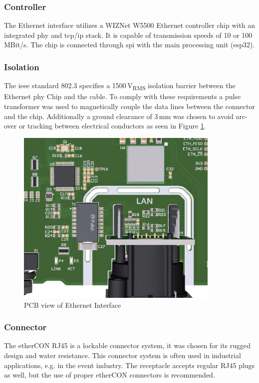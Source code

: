\subsubsection{Controller}
The Ethernet interface utilizes a WIZNet W5500 Ethernet controller chip with an integrated \acrshort{phy} and \acrshort{tcp}/\acrshort{ip} stack. It is capable of transmission speeds of 10 or 100\,MBit/s. The chip is connected through \acrshort{spi} with the main processing unit (\gls{esp32}).

\subsubsection{Isolation}
The \acrshort{ieee} standard 802.3 specifies a 1500\,V\textsubscript{RMS} isolation barrier between the Ethernet \acrshort{phy} Chip and the cable. To comply with these requirements a pulse transformer was used to magnetically couple the data lines between the connector and the chip. Additionally a ground clearance of 3\,mm was chosen to avoid arc-over or tracking between electrical conductors as seen in Figure \ref{fig:eth-pcb}. 

\begin{figure}[h!]
	\centering
	\includegraphics[height=8.5cm]{images/eth-pcb}
	\vspace{0.2cm}
	\caption{PCB view of Ethernet Interface}
	\label{fig:eth-pcb}
\end{figure}
\newpage

\subsubsection{Connector}
The etherCON RJ45 is a lockable connector system, it was chosen for its rugged design and water resistance. This connector system is often used in industrial applications, e.g. in the event industry. The receptacle accepts regular RJ45 plugs as well, but the use of proper etherCON connectors is recommended.

